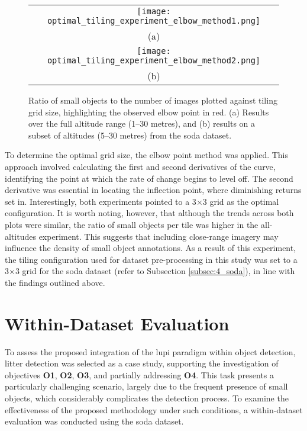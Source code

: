 \begin{figure}[!ht]
  \centering
  \begin{tabular}{c}
    \texttt{[image: optimal\_tiling\_experiment\_elbow\_method1.png]} \\
    \small (a) \\
    \addlinespace[1em]
    \texttt{[image: optimal\_tiling\_experiment\_elbow\_method2.png]} \\
    \small (b) \\
  \end{tabular}
  \caption{Ratio of small objects to the number of images plotted against tiling grid size, highlighting the observed elbow point in red. (a) Results over the full altitude range (1--30 metres), and (b) results on a subset of altitudes (5--30 metres) from the \gls{soda} dataset.}
  \label{fig:elbow_plot}
\end{figure}

To determine the optimal grid size, the elbow point \cite{elbow_point} method was applied. This approach involved calculating the first and second derivatives of the curve, identifying the point at which the rate of change begins to level off. The second derivative was essential in locating the inflection point, where diminishing returns set in.
Interestingly, both experiments pointed to a 3$\times$3 grid as the optimal configuration. It is worth noting, however, that although the trends across both plots were similar, the ratio of small objects per tile was higher in the all-altitudes experiment. This suggests that including close-range imagery may influence the density of small object annotations.
As a result of this experiment, the tiling configuration used for dataset pre-processing in this study was set to a 3$\times$3 grid for the \gls{soda} dataset (refer to Subsection \ref{subsec:4_soda}), in line with the findings outlined above.

\section{Within-Dataset Evaluation}
\label{sec:5_within_dataset_exp}


To assess the proposed integration of the \gls{lupi} paradigm within object detection, litter detection was selected as a case study, supporting the investigation of objectives \textbf{O1}, \textbf{O2}, \textbf{O3}, and partially addressing \textbf{O4}. This task presents a particularly challenging scenario, largely due to the frequent presence of small objects, which considerably complicates the detection process. To examine the effectiveness of the proposed methodology under such conditions, a within-dataset evaluation was conducted using the \gls{soda} dataset.

